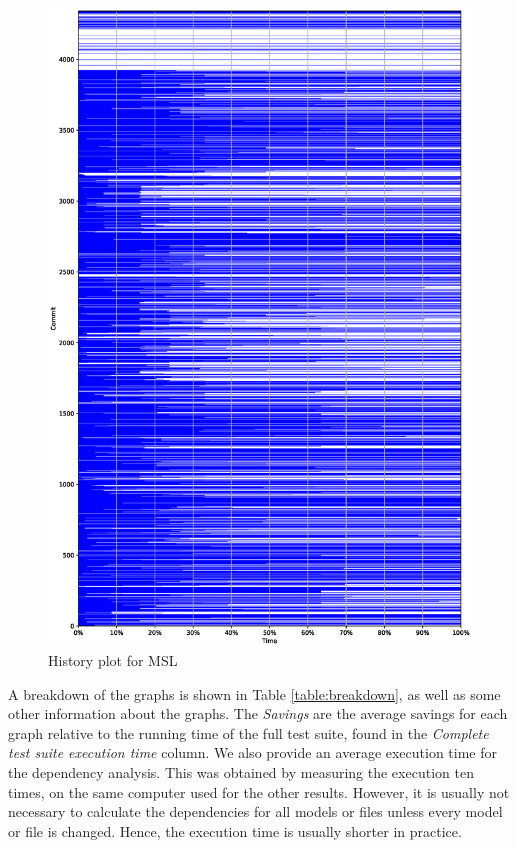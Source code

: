 \documentclass{cslthse-msc}
\begin{document}
\begin{figure}[!htbp]
    \centering
    \includegraphics[width=\textwidth]{Graphs/MSL_history_plot.eps}
    \caption{History plot for MSL}
    \label{fig:mslhistory}
\end{figure}

A breakdown of the graphs is shown in Table \ref{table:breakdown}, as well as some other information about the graphs. The \textit{Savings} are the average savings for each graph relative to the running time of the full test suite, found in the \textit{Complete test suite execution time} column. We also provide an average execution time for the dependency analysis. This was obtained by measuring the execution ten times, on the same computer used for the other results. However, it is usually not necessary to calculate the dependencies for all models or files unless every model or file is changed. Hence, the execution time is usually shorter in practice.
\end{document}
